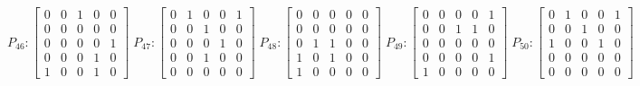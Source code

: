     $$
        P_{46} : \begin{bmatrix}
            0 & 0 & 1 & 0 & 0 \\
            0 & 0 & 0 & 0 & 0 \\
            0 & 0 & 0 & 0 & 1 \\
            0 & 0 & 0 & 1 & 0 \\
            1 & 0 & 0 & 1 & 0
        \end{bmatrix}
        \;
         P_{47} : \begin{bmatrix}
            0 & 1 & 0 & 0 & 1 \\
            0 & 0 & 1 & 0 & 0 \\
            0 & 0 & 0 & 1 & 0 \\
            0 & 0 & 1 & 0 & 0 \\
            0 & 0 & 0 & 0 & 0
        \end{bmatrix}
        \;
        P_{48} : \begin{bmatrix}
            0 & 0 & 0 & 0 & 0 \\
            0 & 0 & 0 & 0 & 0 \\
            0 & 1 & 1 & 0 & 0 \\
            1 & 0 & 1 & 0 & 0 \\
            1 & 0 & 0 & 0 & 0
        \end{bmatrix}
        \; 
        P_{49} : \begin{bmatrix}
            0 & 0 & 0 & 0 & 1 \\
            0 & 0 & 1 & 1 & 0 \\
            0 & 0 & 0 & 0 & 0 \\
            0 & 0 & 0 & 0 & 1 \\
            1 & 0 & 0 & 0 & 0
        \end{bmatrix}
        \;
        P_{50} : \begin{bmatrix}
            0 & 1 & 0 & 0 & 1 \\
            0 & 0 & 1 & 0 & 0 \\
            1 & 0 & 0 & 1 & 0 \\
            0 & 0 & 0 & 0 & 0 \\
            0 & 0 & 0 & 0 & 0
        \end{bmatrix}
    $$

